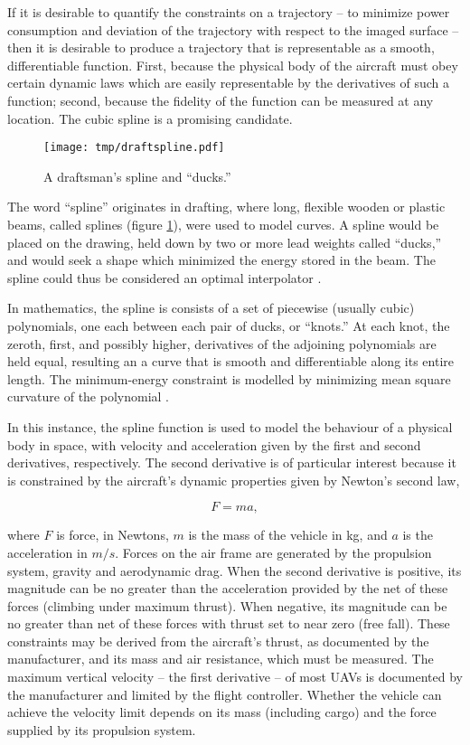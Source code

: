 \documentclass[doc]{apa6}
\begin{document}
If it is desirable to quantify the constraints on a trajectory -- to minimize power consumption and deviation of the trajectory with respect to the imaged surface -- then it is desirable to produce a trajectory that is representable as a smooth, differentiable function. First, because the physical body of the aircraft must obey certain dynamic laws which are easily representable by the derivatives of such a function; second, because the fidelity of the function can be measured at any location. The cubic spline is a promising candidate.

\begin{figure} %
\texttt{[image: tmp/draftspline.pdf]} 
\caption{A draftsman's spline and ``ducks.'' \parencite{DeBoor2006}}
\label{fig:spline}
\end{figure}

The word ``spline'' originates in drafting, where long, flexible wooden or plastic beams, called splines (figure \ref{fig:spline}), were used to model curves. A spline would be placed on the drawing, held down by two or more lead weights called ``ducks,'' and would seek a shape which minimized the energy stored in the beam. The spline could thus be considered an optimal interpolator \parencite{Wegman2016}. 

In mathematics, the spline is consists of a set of piecewise (usually cubic) polynomials, one each between each pair of ducks, or ``knots.'' At each knot, the zeroth, first, and possibly higher, derivatives of the adjoining polynomials are held equal, resulting an a curve that is smooth and differentiable along its entire length. The minimum-energy constraint is modelled by minimizing mean square curvature of the polynomial \parencite{Wegman2016}.

In this instance, the spline function is used to model the behaviour of a physical body in space, with velocity and acceleration given by the first and second derivatives, respectively. The second derivative is of particular interest because it is constrained by the aircraft's dynamic properties given by Newton's second law,

\begin{equation}
F = ma,
\end{equation} 

where $F$ is force, in Newtons, $m$ is the mass of the vehicle in kg, and $a$ is the acceleration in $m/s$. Forces on the air frame are generated by the propulsion system, gravity and aerodynamic drag. When the second derivative is positive, its magnitude can be no greater than the acceleration provided by the net of these forces (climbing under maximum thrust). When negative, its magnitude can be no greater than net of these forces with thrust set to near zero (free fall). These constraints may be derived from the aircraft's thrust, as documented by the manufacturer, and its mass and air resistance, which must be measured. The maximum vertical velocity -- the first derivative -- of most UAVs is documented by the manufacturer and limited by the flight controller. Whether the vehicle can achieve the velocity limit depends on its mass (including cargo) and the force supplied by its propulsion system.
\end{document}
